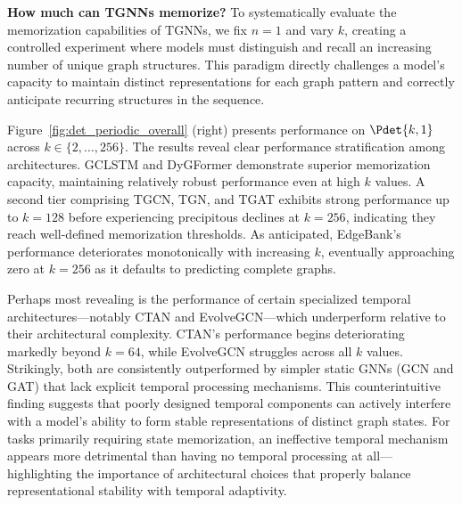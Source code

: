  \textbf{How much can TGNNs memorize?} To systematically evaluate the memorization capabilities of TGNNs, we fix $n = 1$ and vary $k$, creating a controlled experiment where models must distinguish and recall an increasing number of unique graph structures. This paradigm directly challenges a model's capacity to maintain distinct representations for each graph pattern and correctly anticipate recurring structures in the sequence. \label{seq:memorize}

 Figure~\ref{fig:det_periodic_overall} (right) presents performance on $\Pdet{k, 1}$ across $k \in \{2,\ldots,256\}$. The results reveal clear performance stratification among architectures. GCLSTM and DyGFormer demonstrate superior memorization capacity, maintaining relatively robust performance even at high $k$ values. A second tier comprising TGCN, TGN, and TGAT exhibits strong performance up to $k = 128$ before experiencing precipitous declines at $k = 256$, indicating they reach well-defined memorization thresholds. As anticipated, EdgeBank's performance deteriorates monotonically with increasing $k$, eventually approaching zero at $k = 256$ as it defaults to predicting complete graphs.

 Perhaps most revealing is the performance of certain specialized temporal architectures—notably CTAN and EvolveGCN—which underperform relative to their architectural complexity. CTAN's performance begins deteriorating markedly beyond $k=64$, while EvolveGCN struggles across all $k$ values. Strikingly, both are consistently outperformed by simpler static GNNs (GCN and GAT) that lack explicit temporal processing mechanisms. This counterintuitive finding suggests that poorly designed temporal components can actively interfere with a model's ability to form stable representations of distinct graph states. For tasks primarily requiring state memorization, an ineffective temporal mechanism appears more detrimental than having no temporal processing at all—highlighting the importance of architectural choices that properly balance representational stability with temporal adaptivity.



